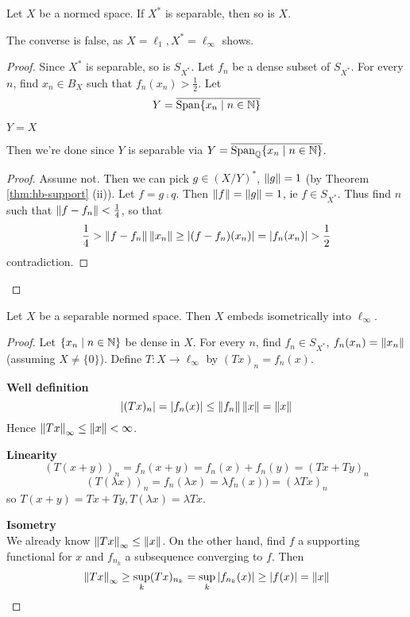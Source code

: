 \documentclass{article}
\begin{document}
\begin{thm}
  Let $X$ be a normed space. If $X^*$ is separable, then so is $X$.
\end{thm}
\begin{rmk}
  The converse is false, as $X = \ell_1, X^* = \ell_\infty$ shows.
\end{rmk}
\begin{proof}
  Since $X^*$ is separable, so is $S_{X^*}$. Let $f_n$ be a dense subset of $S_{X^*}$. For every $n$, find $x_n \in B_X$ such that $f_n(x_n) > \frac 12$. Let
  $$Y = \overline{\operatorname{Span}\{x_n \mid n \in \mathbb N\}}$$
  \begin{claim}
    $Y = X$
  \end{claim}
  Then we're done since $Y$ is separable via $Y = \overline{\operatorname{Span}_\mathbb Q\{x_n \mid n \in \mathbb N\}}$.
  \begin{proof}
    Assume not. Then we can pick $g \in (X/Y)^*$, $\left\lVert g\right\rVert = 1$ (by Theorem \ref{thm:hb-support} (ii)). Let $f = g \comp q$. Then $\left\lVert f\right\rVert = \left\lVert g\right\rVert = 1$, ie $f \in S_{X^*}$. Thus find $n$ such that $\left\lVert f - f_n\right\rVert < \frac 14$, so that
    $$\frac 14 > \left\lVert f - f_n\right\rVert\left\lVert x_n\right\rVert \ge \left\lvert (f - f_n)(x_n)\right\rvert = \left\lvert f_n(x_n)\right\rvert > \frac 12$$
    contradiction.
  \end{proof}
\end{proof}

\begin{thm}
  Let $X$ be a separable normed space. Then $X$ embeds isometrically into $\ell_\infty$.
\end{thm}
\begin{proof}
  Let $\{x_n \mid n \in \mathbb N\}$ be dense in $X$. For every $n$, find $f_n \in S_{X^*}$, $f_n(x_n) = \left\lVert x_n\right\rVert$ (assuming $X \ne \{0\}$). Define $T : X \to \ell_\infty$ by $(Tx)_n = f_n(x)$.

  {\bf Well definition}
  $$ \left\lvert (Tx)_n\right\rvert = \left\lvert f_n(x)\right\rvert \le \left\lVert f_n\right\rVert\left\lVert x\right\rVert = \left\lVert x\right\rVert$$
  Hence $\left\lVert Tx\right\rVert_\infty \le \left\lVert x\right\rVert < \infty$.

  {\bf Linearity}
  $$ (T(x + y))_n = f_n(x + y) = f_n(x) + f_n(y) = (Tx + Ty)_n$$
  $$ (T(\lambda x))_n = f_n(\lambda x) = \lambda f_n(x)) = (\lambda Tx)_n$$
  so $T(x + y) = Tx + Ty, T(\lambda x) = \lambda Tx$.

  {\bf Isometry} \\
  We already know $\left\lVert Tx\right\rVert_\infty \le \left\lVert x\right\rVert$. On the other hand, find $f$ a supporting functional for $x$ and $f_{n_k}$ a subsequence converging to $f$. Then
  $$\left\lVert Tx\right\rVert_\infty \ge \sup_k (Tx)_{n_k} = \sup_k \left\lvert f_{n_k}(x)\right\rvert \ge \left\lvert f(x)\right\rvert = \left\lVert x\right\rVert$$
\end{proof}
\end{document}
